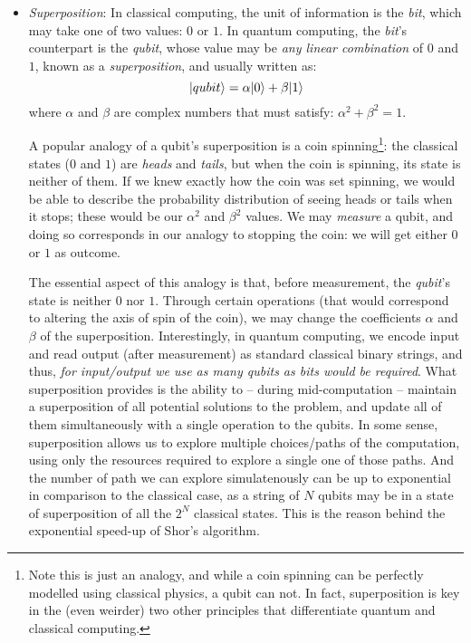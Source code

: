 \begin{itemize}

  \item \textit{Superposition}: In classical computing, the unit of information is the \textit{bit}, which may take one of two values: \(0\) or \(1\). In quantum computing, the \textit{bit}'s counterpart is the \textit{qubit}, whose value may be \textit{any linear combination} of \(0\) and \(1\), known as a \textit{superposition}, and usually written as: \[\vert qubit \rangle = \alpha\vert 0 \rangle + \beta\vert 1 \rangle\] where \(\alpha\) and \(\beta\) are complex numbers that must satisfy: \(\alpha^2 + \beta^2 = 1\).

  A popular analogy of a qubit's superposition is a coin spinning\footnote{Note this is just an analogy, and while a coin spinning can be perfectly modelled using classical physics, a qubit can not. In fact, superposition is key in the (even weirder) two other principles that differentiate quantum and classical computing.
  }: the classical states (\(0\) and \(1\)) are \textit{heads} and \textit{tails}, but when the coin is spinning, its state is neither of them. If we knew exactly how the coin was set spinning, we would be able to describe the probability distribution of seeing heads or tails when it stops; these would be our \(\alpha^2\) and \(\beta^2\) values. We may \textit{measure} a qubit, and doing so corresponds in our analogy to stopping the coin: we will get either \(0\) or \(1\) as outcome.

  The essential aspect of this analogy is that, before measurement, the \textit{qubit}'s state is neither \(0\) nor \(1\). Through certain operations (that would correspond to altering the axis of spin of the coin), we may change the coefficients \(\alpha\) and \(\beta\) of the superposition. Interestingly, in quantum computing, we encode input and read output (after measurement) as standard classical binary strings, and thus, \textit{for input/output we use as many qubits as bits would be required}. What superposition provides is the ability to -- during mid-computation -- maintain a superposition of all potential solutions to the problem, and update all of them simultaneously with a single operation to the qubits. In some sense, superposition allows us to explore multiple choices/paths of the computation, using only the resources required to explore a single one of those paths. And the number of path we can explore simulatenously can be up to exponential in comparison to the classical case, as a string of \(N\) qubits may be in a state of superposition of all the \(2^N\) classical states. This is the reason behind the exponential speed-up of Shor's algorithm.


\end{itemize}

